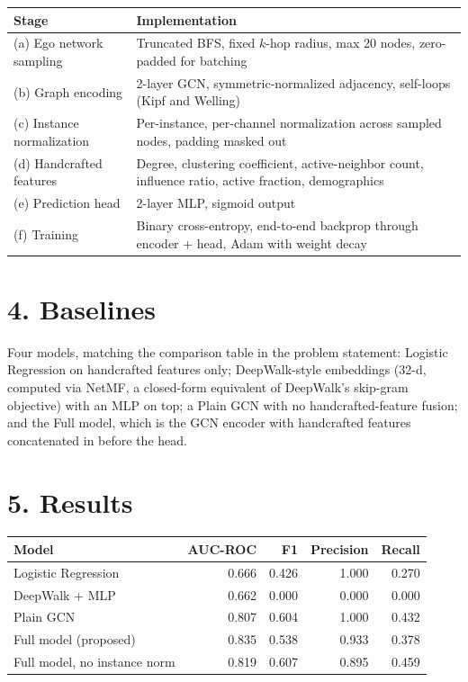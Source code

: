 \documentclass[11pt]{article}
\begin{document}
\begin{center}
\begin{tabular}{@{}p{3.6cm}p{10.4cm}@{}}
\toprule
\textbf{Stage} & \textbf{Implementation} \\
\midrule
(a) Ego network sampling & Truncated BFS, fixed $k$-hop radius, max 20 nodes, zero-padded for batching \\
(b) Graph encoding & 2-layer GCN, symmetric-normalized adjacency, self-loops (Kipf and Welling) \\
(c) Instance normalization & Per-instance, per-channel normalization across sampled nodes, padding masked out \\
(d) Handcrafted features & Degree, clustering coefficient, active-neighbor count, influence ratio, active fraction, demographics \\
(e) Prediction head & 2-layer MLP, sigmoid output \\
(f) Training & Binary cross-entropy, end-to-end backprop through encoder + head, Adam with weight decay \\
\bottomrule
\end{tabular}
\end{center}

\section*{4. Baselines}
Four models, matching the comparison table in the problem statement: Logistic Regression on handcrafted features only; DeepWalk-style embeddings (32-d, computed via NetMF, a closed-form equivalent of DeepWalk's skip-gram objective) with an MLP on top; a Plain GCN with no handcrafted-feature fusion; and the Full model, which is the GCN encoder with handcrafted features concatenated in before the head.

\section*{5. Results}
\begin{center}
\begin{tabular}{@{}lrrrr@{}}
\toprule
\textbf{Model} & \textbf{AUC-ROC} & \textbf{F1} & \textbf{Precision} & \textbf{Recall} \\
\midrule
Logistic Regression & 0.666 & 0.426 & 1.000 & 0.270 \\
DeepWalk + MLP & 0.662 & 0.000 & 0.000 & 0.000 \\
Plain GCN & 0.807 & 0.604 & 1.000 & 0.432 \\
Full model (proposed) & 0.835 & 0.538 & 0.933 & 0.378 \\
Full model, no instance norm & 0.819 & 0.607 & 0.895 & 0.459 \\
\bottomrule
\end{tabular}
\end{center}
\end{document}
